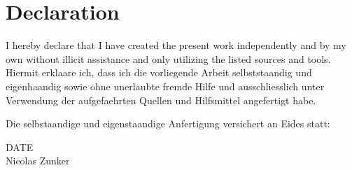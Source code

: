 
\cleardoublepage
\section*{Declaration}
I hereby declare that I have created the present work independently and by my own without illicit assistance and only utilizing the listed sources and tools.\\

Hiermit erklaare ich, dass ich die vorliegende Arbeit selbststaandig und eigenhaandig sowie ohne unerlaubte fremde Hilfe und ausschliesslich unter Verwendung der aufgefaehrten Quellen und Hilfsmittel angefertigt habe.

Die selbstaandige und eigenstaandige Anfertigung versichert an Eides statt:
\begin{center}
DATE\\[3pc]
Nicolas Zunker
\end{center}
